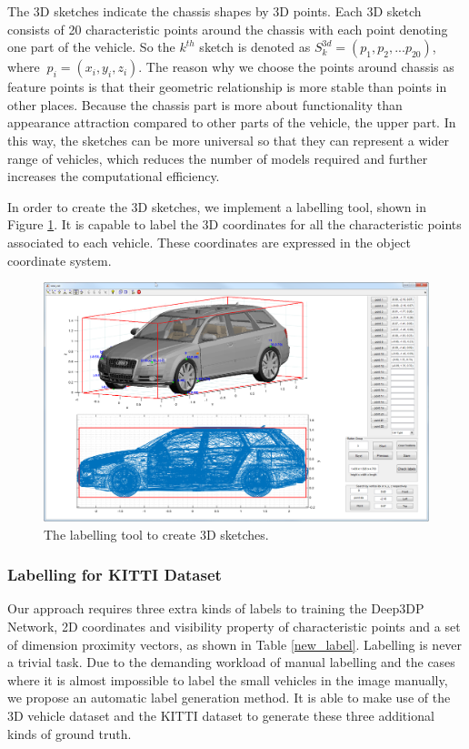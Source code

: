\documentclass[a4paper,12pt]{article}
\begin{document}
The  3D sketches indicate the chassis shapes by 3D points. Each 3D sketch consists of 20 characteristic points around the chassis with each point denoting one part of the vehicle. So the $k^{th}$ sketch is denoted as $S_k^{3d}  = (p_1, p_2, ... p_{20})$, where $~p_i = (x_i, y_i, z_i)$. The reason why we choose the points around chassis as feature points is that their geometric relationship is more stable than points in other places. Because the chassis part is more about functionality than appearance attraction compared to other parts of the vehicle,  \eg the upper part. In this way, the sketches can be more universal so that they can represent a wider range of vehicles, which reduces the number of models required and further increases the computational efficiency. 

In order to create the 3D sketches, we implement a labelling tool, shown in Figure \ref{figure:label_cad}. It is capable to label the 3D coordinates for all the characteristic points associated to each vehicle. These coordinates are expressed in the object coordinate system.


\begin{figure}[H]		
	\includegraphics[width=1\textwidth]{label_cad.png}
	\caption{The labelling tool to create 3D sketches.}
	\centering
	\label{figure:label_cad}
\end{figure}

\subsubsection{Labelling for KITTI Dataset}

Our approach requires three extra kinds of labels to training the Deep3DP Network, \ie 2D coordinates and visibility property of characteristic points and a set of dimension proximity vectors, as shown in Table \ref{new_label}.  Labelling is never a trivial task. Due to the demanding workload of manual labelling and the cases where it is almost impossible to label the small vehicles in the image manually, we propose an automatic label generation method. It is able to make use of the 3D vehicle dataset and the KITTI dataset to generate these three additional kinds of ground truth.
\end{document}
